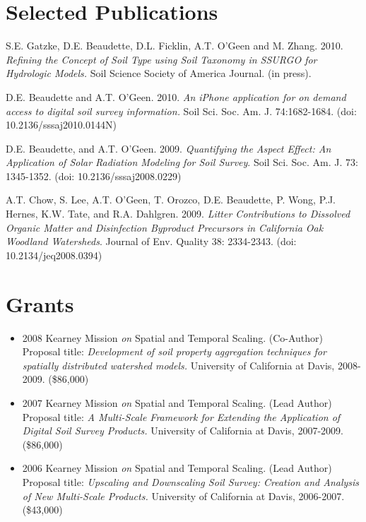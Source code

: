 \documentclass[overlapped,line,10pt,letterpaper]{res}
\begin{document}
\begin{resume}


\section{\bf Selected Publications}
S.E. Gatzke, D.E. Beaudette, D.L. Ficklin, A.T. O'Geen and M. Zhang. 2010. {\em Refining the Concept of Soil Type using Soil Taxonomy in SSURGO for Hydrologic Models.} Soil Science Society of America Journal. (in press).

D.E. Beaudette and A.T. O'Geen. 2010. {\em An iPhone application for on demand access to digital soil survey information.} Soil Sci. Soc. Am. J. 74:1682-1684. (doi: 10.2136/sssaj2010.0144N)

D.E. Beaudette, and A.T. O'Geen. 2009. {\em Quantifying the Aspect Effect: An Application of Solar Radiation Modeling for Soil Survey}. Soil Sci. Soc. Am. J. 73: 1345-1352. (doi: 10.2136/sssaj2008.0229)

A.T. Chow, S. Lee, A.T. O'Geen, T. Orozco, D.E. Beaudette, P. Wong, P.J. Hernes, K.W. Tate, and R.A. Dahlgren. 2009. {\em Litter Contributions to Dissolved Organic Matter and Disinfection Byproduct Precursors in California Oak Woodland Watersheds}. Journal of Env. Quality 38: 2334-2343. (doi: 10.2134/jeq2008.0394)

\section{\bf Grants}

\begin{itemize}
\item 2008 Kearney Mission \textit{on} Spatial and Temporal Scaling. (Co-Author) \\
Proposal title: \textit{Development of soil property aggregation techniques for spatially distributed watershed models.} 
University of California at Davis, 2008-2009. (\$86,000)

\item 2007 Kearney Mission \textit{on} Spatial and Temporal Scaling. (Lead Author) \\
Proposal title: \textit{A Multi-Scale Framework for Extending the Application of Digital Soil Survey Products.} 
University of California at Davis, 2007-2009. (\$86,000)

\item 2006 Kearney Mission \textit{on} Spatial and Temporal Scaling. (Lead Author) \\
Proposal title: \textit{Upscaling and Downscaling Soil Survey: Creation and Analysis of New Multi-Scale Products.} 
University of California at Davis, 2006-2007. (\$43,000)
\end{itemize}

\end{resume}
\end{document}
